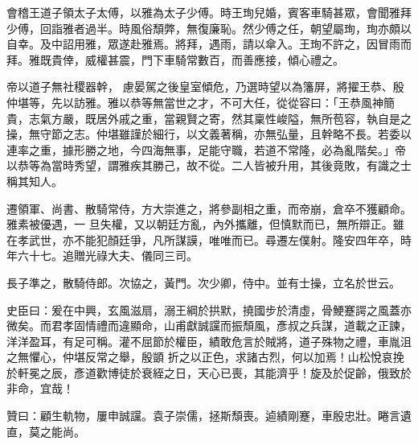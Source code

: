 \begin{pinyinscope}
 會稽王道子領太子太傅，以雅為太子少傅。時王珣兒婚，賓客車騎甚眾，會聞雅拜少傅，回詣雅者過半。時風俗頹弊，無復廉恥。然少傅之任，朝望屬珣，珣亦頗以自幸。及中詔用雅，眾遂赴雅焉。將拜，遇雨，請以傘入。王珣不許之，因冒雨而拜。雅既貴倖，威權甚震，門下車騎常數百，而善應接，傾心禮之。



 帝以道子無社稷器幹，
 慮晏駕之後皇室傾危，乃選時望以為籓屏，將擢王恭、殷仲堪等，先以訪雅。雅以恭等無當世之才，不可大任，從從容曰：「王恭風神簡貴，志氣方嚴，既居外戚之重，當親賢之寄，然其稟性峻隘，無所苞容，執自是之操，無守節之志。仲堪雖謹於細行，以文義著稱，亦無弘量，且幹略不長。若委以連率之重，據形勝之地，今四海無事，足能守職，若道不常隆，必為亂階矣。」帝以恭等為當時秀望，謂雅疾其勝己，故不從。二人皆被升用，其後竟敗，有識之士稱其知人。



 遷領軍、尚書、散騎常侍，方大崇進之，將參副相之重，而帝崩，倉卒不獲顧命。雅素被優遇，一
 旦失權，又以朝廷方亂，內外攜離，但慎默而已，無所辯正。雖在孝武世，亦不能犯顏廷爭，凡所謀謨，唯唯而已。尋遷左僕射。隆安四年卒，時年六十七。追贈光祿大夫、儀同三司。



 長子準之，散騎侍郎。次協之，黃門。次少卿，侍中。並有士操，立名於世云。



 史臣曰：爰在中興，玄風滋扇，溺王綱於拱默，撓國步於清虛，骨鯁蹇諤之風蓋亦微矣。而君孝固情禮而違顯命，山甫獻誠讜而振頹風，彥叔之兵謀，道載之正諫，洋洋盈耳，有足可稱。灌不屈節於權臣，績敢危言於賊將，道子殊物之禮，車胤沮之無懼心，仲堪反常之舉，殷顗
 折之以正色，求諸古烈，何以加焉！山松悅哀挽於軒冕之辰，彥道歡博徒於衰絰之日，天心已喪，其能濟乎！旋及於促齡，俄致於非命，宜哉！



 贊曰：顧生軌物，屢申誠讜。袁子崇儒，拯斯頹喪。逌績剛蹇，車殷忠壯。睠言遺直，莫之能尚。



\end{pinyinscope}